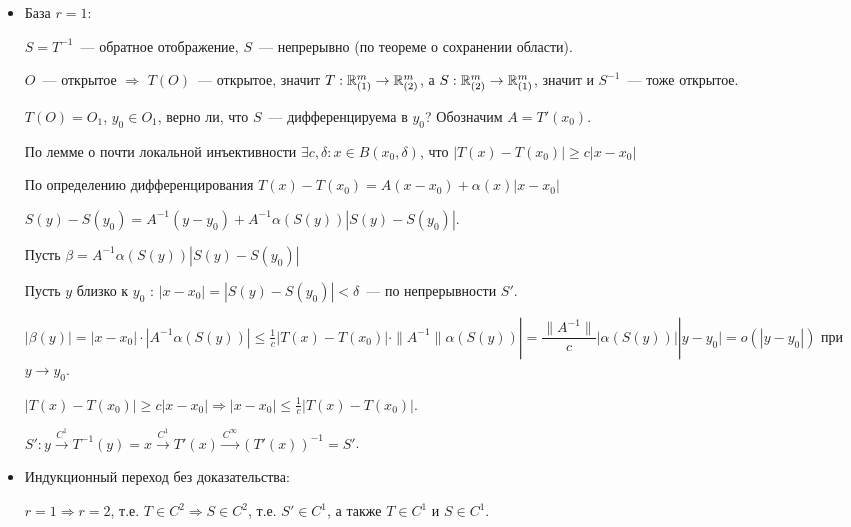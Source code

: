 \documentclass{article}
\begin{document}
            \begin{itemize}
            
                \item База $r = 1$:
                
                    $S = T^{-1}$~--- обратное отображение, $S$~--- непрерывно (по теореме о сохранении области).
                    
                    $O$~--- открытое $\Rightarrow$ $T(O)$~--- открытое, значит $T: \mathbb{R}^m_{(1)} \rightarrow \mathbb{R}^m_{(2)}$, а $S : \mathbb{R}^m_{(2)} \rightarrow \mathbb{R}^m_{(1)}$, значит и $S^{-1}$~--- тоже открытое.
                    
                    $T(O) = O_1$, $y_0 \in O_1$, верно ли, что $S$~--- дифференцируема в $y_0$? Обозначим $A = T'(x_0)$.
                    
                    По лемме о почти локальной инъективности $\exists c, \delta : x \in B(x_0, \delta)$, что $\left| T(x) - T(x_0) \right| \geq c | x - x_0 |$
                    
                    По определению дифференцирования $T(x) - T(x_0) = A(x - x_0) + \alpha(x) | x - x_0 |$
                    
                    $S(y) - S(y_0) = A^{-1} (y - y_0) + A^{-1} \alpha \left( S(y) \right) \left| S(y) - S(y_0) \right|$.
                    
                    Пусть $\beta = A^{-1} \alpha \left( S(y) \right) \left| S(y) - S(y_0) \right|$
                    
                    Пусть $y$ близко к $y_0$ : $| x - x_0 | = \left| S(y) - S(y_0) \right| < \delta$~--- по непрерывности $S'$.
                    
                    $| \beta(y) | = |x - x_0| \cdot \left| A^{-1} \alpha \left( S(y) \right) \right| \leq \frac{1}{c} \left| T(x) - T(x_0) \right| \cdot \| A^{-1} \| \alpha \left( S(y) \right) | = \dfrac{\| A^{-1} \|}{c} \left| \alpha \left( S(y) \right) \right| |y - y_0| = o(|y - y_0|)$ при $y \rightarrow y_0$.
                    
                    $\left| T(x) - T(x_0) \right| \geq c | x - x_0 | \Rightarrow | x - x_0 | \leq \frac{1}{c} \left| T(x) - T(x_0) \right|$.
                    
                    $S' : y \xrightarrow{C^1} T^{-1} (y) = x \xrightarrow{C^1} T'(x) \xrightarrow{C^{\infty}} \left(T'(x)\right)^{-1} = S'$.
                    
                \item Индукционный переход без доказательства:
                
                    $r = 1 \Rightarrow r = 2$, т.е. $T \in C^2 \Rightarrow S \in C^2$, т.е. $S' \in C^1$, а также $T \in C^1$ и $S \in C^1$.
                    
            \end{itemize}
            
\end{document}

